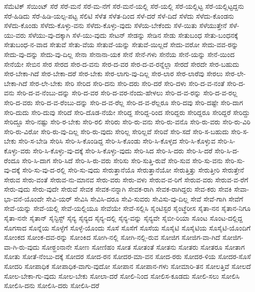 {ಸೆಮೆಟಿಕ್
ಸೆಯಿಂಟ್
ಸೆರೆ
ಸೆರೆ-ಮನೆ
ಸೆರೆ-ಮ-ನೆಗೆ
ಸೆರೆ-ಮನೆ-ಯಲ್ಲಿ
ಸೆರೆ-ಯಲ್ಲಿ
ಸೆರೆ-ಯಲ್ಲಿಟ್ಟ
ಸೆರೆ-ಯಲ್ಲಿಟ್ಟದ್ದನು
ಸೆರೆ-ಹಿಡಿದು
ಸೆರೆ-ಹಿಡಿ-ಯಲ್ಪ-ಪಟ್ಟ
ಸೆಲಿಟಿ
ಸೆಳೆತ
ಸೆಳೆತ-ದಿಂದ
ಸೆಳೆ-ದರೆ
ಸೆಳೆ-ದಿದೆ
ಸೆಳೆದು
ಸೆಳೆದು-ಕೊಂಡನು
ಸೆಳೆದು-ಕೊಂಡು
ಸೆಳೆದು-ಕೊಳ್ಳು-ವನು
ಸೆಳೆದು-ಕೊಳ್ಳು-ವುದು
ಸೆಳೆಯ-ಬೇಕೆಂದು
ಸೆಳೆ-ಯಿತು
ಸೆಳೆಯುತ್ತೇನೆ
ಸೆಳೆ-ಯು-ವರು
ಸೆಳೆಯು-ವು-ದಕ್ಕಾಗಿ
ಸೆಳೆ-ಯು-ವುದು
ಸೇಟನ್
ಸೇಡನ್ನು
ಸೇಡಿನ
ಸೇಡು
ಸೇತುಬಂಧ
ಸೇತು-ಬಂಧನಕ್ಕೆ
ಸೇತುಬಂಧ-ನ-ವಾದ
ಸೇತುವೆ
ಸೇತು-ವೆಯ
ಸೇತುವೆ-ಯನ್ನು
ಸೇತುವೆ-ಯಿಲ್ಲದೆ
ಸೇದು-ವರೋ
ಸೇದು-ವವ-ರನ್ನು
ಸೇದು-ವು-ದನ್ನು
ಸೇದು-ವು-ದಿಲ್ಲ
ಸೇನಾ
ಸೇನಾನಾ-ಯಕ
ಸೇನೆ
ಸೇನೆ-ಗಳು
ಸೇನೆಯ
ಸೇನೆ-ಯನ್ನು
ಸೇನೆ-ಯಿಂದ
ಸೇನೆಯೇ
ಸೇಬಿನ
ಸೇರ
ಸೇರದ
ಸೇರ-ದ-ವನು
ಸೇರ-ದ-ವರ
ಸೇರ-ದ-ವ-ರನ್ನೆಲ್ಲಾ
ಸೇರದೆ
ಸೇರದೇ
ಸೇರ-ಬಹುದು
ಸೇರ-ಬೇಕಾ-ಗಿದೆ
ಸೇರ-ಬೇಕಾ-ದರೆ
ಸೇರ-ಬೇಕು
ಸೇರ-ಲಾಗು-ವು-ದಿಲ್ಲ
ಸೇರ-ಲಾರ
ಸೇರ-ಲಾರೆವು
ಸೇರಲು
ಸೇರ-ಲೇ-ಬೇಕಾ-ಗಿದೆ
ಸೇರ-ಲೇ-ಬೇಕು
ಸೇರಿ
ಸೇರಿದ
ಸೇರಿ-ದನು
ಸೇರಿ-ದರು
ಸೇರಿ-ದರೆ
ಸೇರಿ-ದಳು
ಸೇರಿ-ದ-ವ-ನಂತೆ
ಸೇರಿ-ದ-ವನು
ಸೇರಿ-ದ-ವ-ನೆಂಬು-ದನ್ನು
ಸೇರಿ-ದ-ವರ
ಸೇರಿ-ದ-ವರ-ನೆಂದು-ಹೇಳಲು
ಸೇರಿ-ದ-ವ-ರನ್ನು
ಸೇರಿ-ದ-ವ-ರಲ್ಲ
ಸೇರಿ-ದ-ವರು
ಸೇರಿ-ದ-ವ-ರೆಂಬು-ದನ್ನು
ಸೇರಿ-ದ-ವ-ರೆಲ್ಲ
ಸೇರಿ-ದ-ವ-ರೆಲ್ಲರೂ
ಸೇರಿ-ದವು
ಸೇರಿ-ದಷ್ಟೇ
ಸೇರಿ-ದಾಗ
ಸೇರಿ-ದುದು
ಸೇರಿ-ದುವು
ಸೇರಿದೆ
ಸೇರಿ-ದೊಡ-ನೆಯೇ
ಸೇರಿದ್ದ
ಸೇರಿದ್ದ-ರಿಂದ
ಸೇರಿದ್ದರು
ಸೇರಿದ್ದರೂ
ಸೇರಿದ್ದರೆ
ಸೇರಿದ್ದು
ಸೇರಿದ್ದೂ
ಸೇರಿ-ನಷ್ಟು
ಸೇರಿ-ರ-ಬೇಕು
ಸೇರಿ-ರಲಿ
ಸೇರಿರು
ಸೇರಿ-ರು-ವನು
ಸೇರಿ-ರು-ವನೊ
ಸೇರಿ-ರು-ವರು
ಸೇರಿ-ರು-ವಿರಿ
ಸೇರಿ-ರು-ವಿರೋ
ಸೇರಿ-ರು-ವು-ದಿಲ್ಲ
ಸೇರಿ-ರು-ವುದು
ಸೇರಿಲ್ಲ
ಸೇರಿಲ್ಲವೆ
ಸೇರಿವೆ
ಸೇರಿ-ಸದೆ
ಸೇರಿ-ಸ-ಬಹುದು
ಸೇರಿ-ಸ-ಬೇಕು
ಸೇರಿ-ಸ-ಬೇಡಿ
ಸೇರಿಸಿ
ಸೇರಿ-ಸಿ-ಕೊಂಡಿದ್ದ
ಸೇರಿ-ಸಿ-ಕೊಂಡು
ಸೇರಿ-ಸಿ-ಕೊಳ್ಳದ
ಸೇರಿ-ಸಿ-ಕೊಳ್ಳುವ
ಸೇರಿ-ಸಿ-ಕೊಳ್ಳು-ವರು
ಸೇರಿ-ಸಿ-ಕೊಳ್ಳು-ವು-ದಕ್ಕೆ
ಸೇರಿ-ಸಿ-ಕೊಳ್ಳು-ವುದು
ಸೇರಿ-ಸಿದ
ಸೇರಿ-ಸಿ-ದರು
ಸೇರಿ-ಸಿ-ದರೆ
ಸೇರಿ-ಸಿ-ದ-ರೆಂದೂ
ಸೇರಿ-ಸಿ-ದಾಗ
ಸೇರಿ-ಸಿದೆ
ಸೇರಿ-ಸಿ-ರು-ವರು
ಸೇರಿಸು
ಸೇರಿ-ಸುತ್ತಿ-ರುವೆ
ಸೇರಿ-ಸುವ
ಸೇರಿ-ಸು-ವನು
ಸೇರಿ-ಸು-ವು-ದಕ್ಕೆ
ಸೇರಿ-ಸು-ವು-ದ-ರಲ್ಲಿ
ಸೇರಿ-ಸು-ವುದು
ಸೇರುತ್ತಾನೆಯೊ
ಸೇರುತ್ತಾನೆಯೋ
ಸೇರುತ್ತಿತ್ತು
ಸೇರುತ್ತೀರಿ
ಸೇರುತ್ತೇನೆ
ಸೇರುವ
ಸೇರು-ವಂತೆ
ಸೇರುವ-ನು-ಮಾನವ
ಸೇರು-ವರು
ಸೇರು-ವಳು
ಸೇರುವ-ವ-ರಿಗೆ
ಸೇರುವ-ವರು
ಸೇರುವ-ವ-ರೆಗೆ
ಸೇರು-ವುದು
ಸೇರು-ವುದೇ
ಸೇರುವೆ
ಸೇವಕ
ಸೇವಕ-ನನ್ನಾಗಿ
ಸೇವಕ-ರಾಗಿ
ಸೇವಕ-ರಾಗಿದ್ದರು
ಸೇವ-ಕರು
ಸೇವಕಿ
ಸೇವಾ-ಭಾ-ವನೆ-ಯೊಂದೇ
ಸೇವಿ-ಯರ್
ಸೇವಿಸಿ
ಸೇವಿಸಿ-ದರೂ
ಸೇವಿ-ಸುವರು
ಸೇವಿಸು-ವು-ದಿಲ್ಲ
ಸೇವೆ
ಸೇವೆ-ಗಾಗಿ
ಸೇವೆಗೆ
ಸೇವೆ-ಯನ್ನು
ಸೇವೆ-ಯಲ್ಲಿ
ಸೇವೆ-ಯಲ್ಲಿಯೂ
ಸೇವೆಯೇ
ಸೇವೆ-ಸಲ್ಲಿಸಿ
ಸೈಂಟಿಸ್ಟರ
ಸೈಂಟ್ಥೆರೀಸ
ಸೈತಾ-ನನ
ಸೈತಾನ-ನಿಗೂ
ಸೈತಾ-ನನೇ
ಸೈತಾನ್
ಸೈನ್ಟಿಸ್ಟ್
ಸೈನ್ಯ
ಸೈನ್ಯದ
ಸೈನ್ಯ-ದಲ್ಲಿ
ಸೈನ್ಯ-ವನ್ನು
ಸೈನ್ಯವೇ
ಸೈಬೀ-ರಿಯಾ
ಸೊಂಟ
ಸೊಂಟ-ದಲ್ಲಿದ್ದ
ಸೊಗಸಾದ
ಸೊನ್ನೆಯ
ಸೊಳ್ಳೆಗೆ
ಸೊಳ್ಳೆ-ಯೊಂದು
ಸೊಸೆ
ಸೊಸೆಗೆ
ಸೊಸೆಯ
ಸೊಸೈಟಿ
ಸೊಸೈಟಿಯ
ಸೊಸೈಟಿ-ಯೊಂದಿಗೆ
ಸೋಂಕದ
ಸೋಂಕ-ದವ-ರನ್ನು
ಸೋಂಕಿದ
ಸೋಗಿ-ನಲ್ಲಿ
ಸೋಗಿ-ನಲ್ಲಿ-ರುವ
ಸೋಜಿಗ
ಸೋಜಿಗ-ವಾ-ಗಿದೆ
ಸೋಜಿಗ-ವಾ-ಗಿ-ರು-ವುದು
ಸೋಠ್ಹಂನಾನೇ
ಸೋಣ
ಸೋಣಿಹಂ
ಸೋತ
ಸೋತಂತೆ
ಸೋತನು
ಸೋತರು
ಸೋತರೂ
ಸೋತಾಗ
ಸೋತು
ಸೋತೆ-ನೆಂಬು-ದಕ್ಕೆ
ಸೋದರ
ಸೋದ-ರನ
ಸೋದರ-ಮಾ-ವನ
ಸೋದ-ರರು
ಸೋದರ-ಳಿಯ
ಸೋದರ-ಸೊಸೆ
ಸೋದರಿ
ಸೋಪಾಧಿಕ
ಸೋಪಾಧಿಕ-ವಾಗು-ವುದೋ
ಸೋಪಾನ
ಸೋಪಾನ-ಗಳು
ಸೋಮಾರಿ-ತನ
ಸೋಲತ್ತಿವೆ
ಸೋಲದೆ
ಸೋಲ-ಬೇಕಾ-ಗು-ವುದು
ಸೋಲ-ಬೇಕು
ಸೋಲಾ-ದರೆ
ಸೋಲಿ-ನಿಂದ
ಸೋಲಿಸ-ಕೂಡದು
ಸೋಲಿ-ಸಲು
ಸೋಲಿಸಿ
ಸೋಲಿಸಿ-ದನು
ಸೋಲಿಸಿ-ದರು
ಸೋಲಿಸಿ-ದರೆ
}
